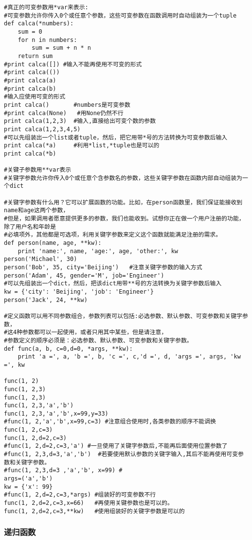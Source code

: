 \documentclass[twoside,11pt]{book}
\begin{document}
\begin{lstlisting}
#真正的可变参数用*var来表示:
#可变参数允许你传入0个或任意个参数，这些可变参数在函数调用时自动组装为一个tuple
def calca(*numbers):
    sum = 0
    for n in numbers:
        sum = sum + n * n
    return sum
#print calca([]) #输入不能再使用不可变的形式
#print calca(())
#print calca(a)
#print calca(b)
#输入应使用可变的形式
print calca()       #numbers是可变参数
#print calca(None)   #用None仍然不行
print calca(1,2,3)  #输入,直接给出可变个数的参数
print calca(1,2,3,4,5)
#可以先组装出一个list或者tuple，然后，把它用带*号的方法转换为可变参数后输入
print calca(*a)     #利用*list,*tuple也是可以的
print calca(*b)

#关键子参数用**var表示
#关键字参数允许你传入0个或任意个含参数名的参数，这些关键字参数在函数内部自动组装为一个dict

#关键字参数有什么用？它可以扩展函数的功能。比如，在person函数里，我们保证能接收到name和age这两个参数，
#但是，如果调用者愿意提供更多的参数，我们也能收到。试想你正在做一个用户注册的功能，除了用户名和年龄是
#必填项外，其他都是可选项，利用关键字参数来定义这个函数就能满足注册的需求。
def person(name, age, **kw):
    print 'name:', name, 'age:', age, 'other:', kw
person('Michael', 30)
person('Bob', 35, city='Beijing')   #注意关键字参数的输入方式
person('Adam', 45, gender='M', job='Engineer')
#可以先组装出一个dict，然后，把该dict用带**号的方法转换为关键字参数后输入
kw = {'city': 'Beijing', 'job': 'Engineer'}
person('Jack', 24, **kw)

#定义函数可以用不同参数组合，参数列表可以包括:必选参数、默认参数、可变参数和关键字参数，
#这4种参数都可以一起使用，或者只用其中某些，但是请注意，
#参数定义的顺序必须是：必选参数、默认参数、可变参数和关键字参数。
def func(a, b, c=0,d=0, *args, **kw):
    print 'a =', a, 'b =', b, 'c =', c,'d =', d, 'args =', args, 'kw =', kw

func(1, 2)
func(1, 2,3)
func(1, 2,3)
func(1, 2,3,'a','b')
func(1, 2,3,'a','b',x=99,y=33)
#func(1, 2,'a','b',x=99,c=3) #注意组合使用时,各类参数的顺序不能调换
func(1, 2,c=3)
func(1, 2,d=2,c=3)
#func(1, 2,d=2,c=3,'a') #一旦使用了关键字参数后,不能再后面使用位置参数了
#func(1, 2,3,d=3,'a','b')  #若要使用默认参数的关键字输入,其后不能再使用可变参数和关键字参数。
#func(1, 2,3,d=3 ,'a','b', x=99) #
args=('a','b')
kw = {'x': 99}
#func(1, 2,d=2,c=3,*args) #组装好的可变参数不行
func(1, 2,d=2,c=3,x=66)   #再使用关键参数也是可以的。
func(1, 2,d=2,c=3,**kw)   #使用组装好的关键字参数是可以的
\end{lstlisting}

\subsubsection{递归函数}
\end{document}
